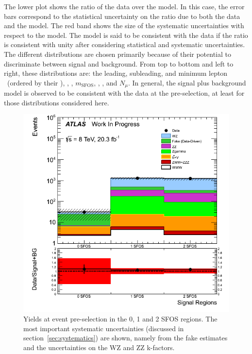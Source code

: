 The lower plot shows the ratio of the data over the model.
In this case, the error bars correspond to the statistical uncertainty
on the ratio due to both the data and the model. The red band
shows the size of the systematic uncertainties with respect to the model.
The model is said to be consistent with the data
if the ratio is consistent with unity after considering statistical
and systematic uncertainties.
The different distributions are chosen primarily because 
of their potential to discriminate between signal and background. 
From top to bottom and left to right,
these distributions are: the leading, subleading, and minimum lepton \pt~(ordered by their \pt),
\MET, \deltaphi, $m_{\textrm{SFOS}}$, \njet, \nbjet, and $N_{\mu}$.
In general, the signal plus background model is observed to be consistent
with the data at the pre-selection, at least for those distributions
considered here.




%



\begin{figure}[ht!]
\centering
\includegraphics[width=0.5\columnwidth]{figures/SFOSPreselection.png}
\caption{Yields at event pre-selection in the 0, 1 and 2 SFOS regions.  
The most important systematic uncertainties 
(discussed in section~\ref{sec:systematics}) are shown, 
namely from the fake estimates and the uncertainties on the WZ and ZZ k-factors.}
\label{fig:preselection_nsfos}
\end{figure}

